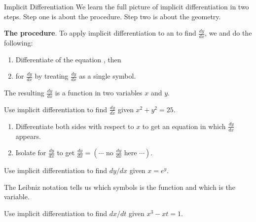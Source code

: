\documentclass[../main.tex]{subfiles}
\begin{document}
\begin{lesson}{Implicit Differentiation}
  We learn the full picture of implicit differentiation in two steps. Step one is about the procedure. Step two is about the geometry.

  \begin{mdframed}[style=simple-compact]
    \textbf{The procedure}. To apply implicit differentiation to an  to find \(\tfrac{dy}{dx}\), we   and do the following:
    \begin{enumerate}
      \item Differentiate  of the equation , then
      \item {} for \(\tfrac{dy}{dx}\) by treating \(\tfrac{dy}{dx}\) as a single symbol.
    \end{enumerate}

    The resulting \(\tfrac{dy}{dx}\) is a function in two variables \(x\) and \(y\). 
  \end{mdframed}

  \begin{example} \label{ex:implicit-circle}
    Use implicit differentiation to find \(\tfrac{dy}{dx}\) given \(x^{2} + y^{2} = 25\). 

    \begin{enumerate}
      \item Differentiate both sides with respect to \(x\) to get an equation in which \(\tfrac{dy}{dx}\) appears.
      \item Isolate for \(\tfrac{dy}{dx}\) to get \(\tfrac{dy}{dx} = \left( \cdots \text{ no } \tfrac{dy}{dx} \text{ here } \cdots \right)\).
    \end{enumerate}
  \end{example}

  \begin{example}
    Use implicit differentiation to find \(dy/dx\) given \(x = e^{y}\). 

  \end{example}

  \clearpage
  The Leibniz notation tells us which symbols is the function and which is the variable.
  \begin{example}
    Use implicit differentiation to find \(dx/dt\) given \(x^{3} - xt = 1\).  

  \end{example}


\end{lesson}
\end{document}
